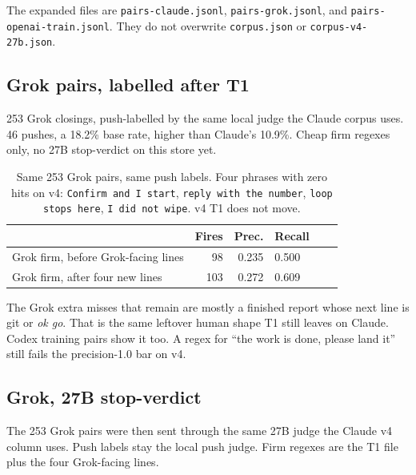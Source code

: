 The expanded files are \texttt{pairs-claude.jsonl},
\texttt{pairs-grok.jsonl}, and \texttt{pairs-openai-train.jsonl}.
They do not overwrite \texttt{corpus.json} or
\texttt{corpus-v4-27b.json}.

\subsection{Grok pairs, labelled after T1}
\label{sec:groklabels}

253 Grok closings, push-labelled by the same local judge the Claude
corpus uses. 46 pushes, a 18.2\% base rate, higher than Claude's
10.9\%. Cheap firm regexes only, no 27B stop-verdict on this store
yet.

\begin{table}[ht]
\centering
{\small\begin{tabular}{lrrlrr}
\toprule
 & Fires & Prec. & Recall \\
\midrule
Grok firm, before Grok-facing lines & 98 & 0.235 & 0.500 \\
Grok firm, after four new lines & 103 & 0.272 & 0.609 \\
\bottomrule
\end{tabular}}
\caption{Same 253 Grok pairs, same push labels. Four phrases with
zero hits on v4: \texttt{Confirm and I start}, \texttt{reply with
the number}, \texttt{loop stops here}, \texttt{I did not wipe}.
v4 T1 does not move.}
\label{tab:grokfirm}
\end{table}

The Grok extra misses that remain are mostly a finished report
whose next line is git or \emph{ok go}. That is the same leftover
human shape T1 still leaves on Claude. Codex training pairs show
it too. A regex for ``the work is done, please land it'' still
fails the precision-1.0 bar on v4.

\subsection{Grok, 27B stop-verdict}
\label{sec:grokshipped}

The 253 Grok pairs were then sent through the same 27B judge the
Claude v4 column uses. Push labels stay the local push judge. Firm
regexes are the T1 file plus the four Grok-facing lines.

